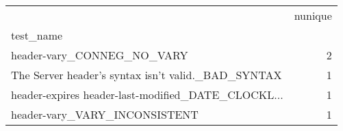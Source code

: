 \begin{tabular}{lr}
\toprule
{} &  nunique \\
test\_name                                          &          \\
\midrule
header-vary\_CONNEG\_NO\_VARY                         &        2 \\
The Server header's syntax isn't valid.\_BAD\_SYNTAX &        1 \\
header-expires header-last-modified\_DATE\_CLOCKL... &        1 \\
header-vary\_VARY\_INCONSISTENT                      &        1 \\
\bottomrule
\end{tabular}
